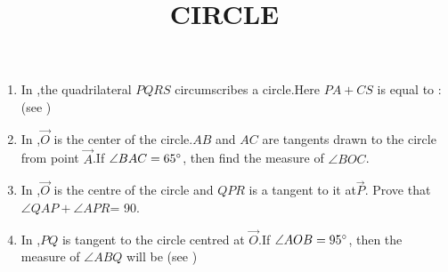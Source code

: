 \documentclass[12pt,A4 paper]{article}
\begin{document}
\title{\textbf{CIRCLE}}
\date{}
\maketitle

\begin{enumerate}
	\item In ,the quadrilateral $PQRS$ circumscribes a circle.Here $PA+CS$ is equal to : (see ) 

\begin{figure}[H]
	        \centering
		
		\caption{}
		\label{fig:fig:1}
\end{figure}



 \begin{table}[!ht]
	        \centering
	        
		\caption{}
		\label{tab:tab:1}
 \end{table}




\item In ,$\vec{O}$ is the center of the circle.$AB$ and $AC$ are tangents drawn to the circle from point $\vec{ A}$.If $\angle BAC=65\degree$, then find the measure of $\angle BOC$.


	\begin{center}
\begin{figure}[H]
	        \centering
	        
		\caption{}
		\label{fig:fig:2}
        \end{figure}
	\end{center}




\item In ,$\vec{ O}$ is the centre of the circle and $QPR$ is a tangent to it at$\vec{ P}$. Prove that $\angle QAP+ \angle APR$= 90\degree.
\begin{figure}[H]
	        \centering
	        
		\caption{}
		\label{fig:fig:3}

        \end{figure}





\item In ,$PQ$ is tangent to the circle centred at $\vec{ O}$.If $\angle AOB= 95\degree$, then the measure of $\angle ABQ$ will be (see )
\begin{figure}[H]
	        \centering
	        
		\caption{}
		\label{fig:fig:4}
        \end{figure}



\end{enumerate}
\end{document}
